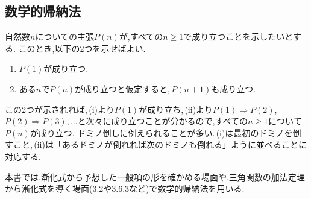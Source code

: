 
  \subsection{数学的帰納法}
    自然数$n$についての主張$P(n)$が,すべての$n\ge1$で成り立つことを示したいとする.
    このとき,以下の2つを示せばよい.
    \begin{enumerate}[label=(\roman*),parsep=3pt]
      \item $P(1)$が成り立つ.
      \item ある$n$で$P(n)$が成り立つと仮定すると,\,$P(n+1)$も成り立つ.
    \end{enumerate}
    この2つが示されれば,\,(i)より$P(1)$が成り立ち,\,(ii)より$P(1)\Rightarrow P(2)$,\,$P(2)\Rightarrow P(3)$,\,$\ldots$と次々に成り立つことが分かるので,すべての$n\ge1$について$P(n)$が成り立つ.
    ドミノ倒しに例えられることが多い.\,(i)は最初のドミノを倒すこと,\,(ii)は「あるドミノが倒れれば次のドミノも倒れる」ように並べることに対応する.

    本書では,漸化式から予想した一般項の形を確かめる場面や,三角関数の加法定理から漸化式を導く場面(3.2や3.6.3など)で数学的帰納法を用いる.